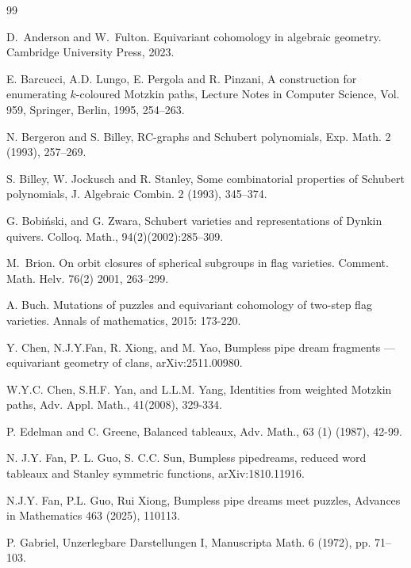 \documentclass[12pt,reqno]{amsart}
\numberwithin{equation}{section}
\theoremstyle{definition}
\begin{document}
\begin{thebibliography}{99}


D.~Anderson and W.~Fulton.
\newblock Equivariant cohomology in algebraic geometry.
\newblock Cambridge University Press, 2023.

E. Barcucci, A.D. Lungo, E. Pergola and R. Pinzani, A construction for enumerating $k$-coloured
Motzkin paths, Lecture Notes in Computer Science, Vol. 959, Springer, Berlin, 1995, 254–263.

N. Bergeron and S. Billey, RC-graphs and Schubert polynomials, Exp. Math. 2
(1993), 257–269.

S. Billey, W. Jockusch and R. Stanley, Some combinatorial properties of Schubert polynomials,  J. Algebraic Combin. 2 (1993), 345–374.

G. Bobi\'nski, and G. Zwara, Schubert varieties and representations of Dynkin quivers. Colloq.
Math., 94(2)(2002):285–309.



M.~Brion.
\newblock On orbit closures of spherical subgroups in flag varieties.
\newblock Comment. Math. Helv. 76(2) 2001, 263--299.

A. Buch. Mutations of puzzles and equivariant cohomology of two-step flag varieties. Annals of mathematics, 2015: 173-220.







Y. Chen, N.J.Y.Fan, R. Xiong, and M. Yao, Bumpless pipe dream fragments --- equivariant geometry of clans, arXiv:2511.00980.


W.Y.C. Chen, S.H.F. Yan, and L.L.M. Yang, 
Identities from weighted Motzkin paths, Adv. Appl. Math., 41(2008), 329-334. 

P. Edelman and C. Greene, Balanced tableaux, Adv. Math., 63 (1) (1987), 42-99.

N. J.Y. Fan, P. L. Guo, S. C.C. Sun, Bumpless pipedreams, reduced word tableaux and Stanley symmetric functions, arXiv:1810.11916.



N.J.Y. Fan, P.L. Guo, Rui Xiong, Bumpless pipe dreams meet puzzles, Advances in Mathematics 463 (2025), 110113.


P. Gabriel, Unzerlegbare Darstellungen I, Manuscripta Math. 6 (1972), pp. 71–103.


\end{thebibliography}
\end{document}
